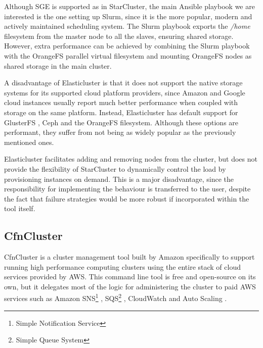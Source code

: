 Although SGE is supported as in StarCluster, the main Ansible playbook we are interested is the one setting up Slurm, since it is the more popular, modern and actively maintained scheduling system. The Slurm playbook exports the \textit{/home} filesystem from the master node to all the slaves, ensuring shared storage. However, extra performance can be achieved by combining the Slurm playbook with the OrangeFS parallel virtual filesystem and mounting OrangeFS nodes as shared storage in the main cluster.



A disadvantage of Elasticluster is that it does not support the native storage systems for its supported cloud platform providers, since Amazon and Google cloud instances usually report much better performance when coupled with storage on the same platform. Instead, Elasticluster has default support for GlusterFS \cite{GlusterFS}, Ceph \cite{Ceph} and the OrangeFS \cite{OrangeFS} filesystem. Although these options are performant, they suffer from not being as widely popular as the previously mentioned ones.

Elasticluster facilitates adding and removing nodes from the cluster, but does not provide the flexibility of StarCluster to dynamically control the load by provisioning instances on demand. This is a major disadvantage, since the responsibility for implementing the behaviour is transferred to the user, despite the fact that failure strategies would be more robust if incorporated within the tool itself.

\subsection{CfnCluster}

CfnCluster is a cluster management tool built by Amazon specifically to support running high performance computing  clusters using the entire stack of cloud services provided by AWS. This command line tool is free and open-source on its own, but it delegates most of the logic for administering the cluster to paid AWS services such as Amazon SNS\footnote{Simple Notification Service} \cite{SNS}, SQS\footnote{Simple Queue System} \cite{SQS}, CloudWatch \cite{CloudWatch} and Auto Scaling \cite{AutoScaling}.

